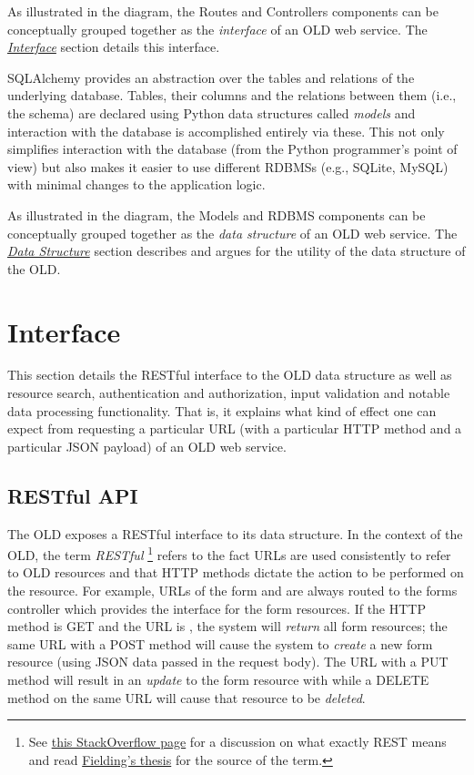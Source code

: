 \documentclass[letterpaper,10pt,english]{sphinxmanual}
\begin{document}
As illustrated in the diagram, the Routes and Controllers components can be
conceptually grouped together as the \emph{interface} of an OLD web service.  The
{\hyperref[interface:interface]{\emph{Interface}}} section details this interface.

SQLAlchemy provides an abstraction over the tables and relations of the
underlying database.  Tables, their columns and the relations between them
(i.e., the schema) are declared using Python data structures called \emph{models} and
interaction with the database is accomplished entirely via these.  This not only
simplifies interaction with the database (from the Python programmer's point of
view) but also makes it easier to use different RDBMSs (e.g., SQLite, MySQL)
with minimal changes to the application logic.

As illustrated in the diagram, the Models and RDBMS components can be
conceptually grouped together as the \emph{data structure} of an OLD web service.
The {\hyperref[datastructure:data-structure]{\emph{Data Structure}}} section describes and argues for the utility of the
data structure of the OLD.


\section{Interface}
\label{interface:interface}\label{interface::doc}\label{interface:id1}
This section details the RESTful interface to the OLD data structure as well as
resource search, authentication and authorization, input validation and notable
data processing functionality.  That is, it explains what kind of effect one can
expect from requesting a particular URL (with a particular HTTP method and a
particular JSON payload) of an OLD web service.


\subsection{RESTful API}
\label{interface:id2}\label{interface:restful-api}
The OLD exposes a RESTful interface to its data structure.  In the context of
the OLD, the term \emph{RESTful} \footnote{
See \href{http://stackoverflow.com/questions/671118/what-exactly-is-restful-programming}{this StackOverflow page}
for a discussion on what exactly REST means and read
\href{http://www.ics.uci.edu/~fielding/pubs/dissertation/fielding\_dissertation.pdf}{Fielding's thesis}
for the source of the term.
} refers to the fact URLs are used consistently
to refer to OLD resources and that HTTP methods dictate the action to be
performed on the resource.  For example, URLs of the form  and
 are always routed to the forms controller which provides the
interface for the form resources.  If the HTTP method is GET and the URL is
, the system will \emph{return} all form resources; the same URL with a
POST method will cause the system to \emph{create} a new form resource (using JSON
data passed in the request body).  The URL  with a PUT method will
result in an \emph{update} to the form resource with  while a DELETE method
on the same URL will cause that resource to be \emph{deleted}.
\end{document}
